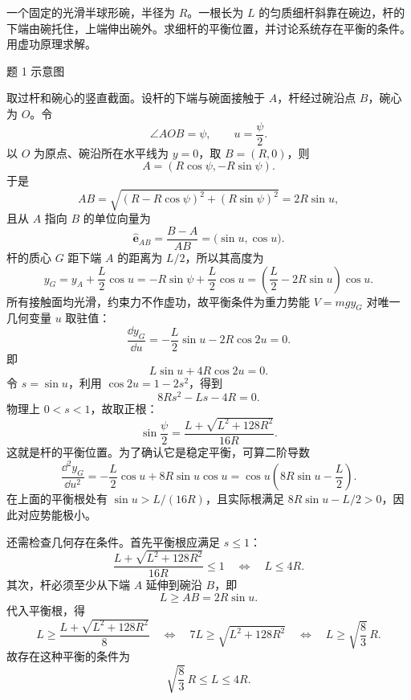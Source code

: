 
\begin{question}[半球碗中的匀质杆]
一个固定的光滑半球形碗，半径为 $R$。一根长为 $L$ 的匀质细杆斜靠在碗边，杆的下端由碗托住，上端伸出碗外。求细杆的平衡位置，并讨论系统存在平衡的条件。用虚功原理求解。

\begin{center}

{\small 题 1 示意图}
\end{center}

\begin{solution}
取过杆和碗心的竖直截面。设杆的下端与碗面接触于 $A$，杆经过碗沿点 $B$，碗心为 $O$。令
\[
  \angle AOB=\psi,
  \qquad u=\frac{\psi}{2}.
\]
以 $O$ 为原点、碗沿所在水平线为 $y=0$，取 $B=(R,0)$，则
\[
  A=(R\cos\psi,-R\sin\psi).
\]
于是
\[
  AB=\sqrt{(R-R\cos\psi)^2+(R\sin\psi)^2}=2R\sin u,
\]
且从 $A$ 指向 $B$ 的单位向量为
\[
  \hat{\bm e}_{AB}
  =\frac{B-A}{AB}
  =\bigl(\sin u,\cos u\bigr).
\]
杆的质心 $G$ 距下端 $A$ 的距离为 $L/2$，所以其高度为
\[
  y_G=y_A+\frac L2\cos u
      =-R\sin\psi+\frac L2\cos u
      =\left(\frac L2-2R\sin u\right)\cos u .
\]
所有接触面均光滑，约束力不作虚功，故平衡条件为重力势能 $V=mg y_G$ 对唯一几何变量 $u$ 取驻值：
\[
  \frac{\dd y_G}{\dd u}
  =-\frac L2\sin u-2R\cos 2u=0.
\]
即
\[
  L\sin u+4R\cos 2u=0.
\]
令 $s=\sin u$，利用 $\cos 2u=1-2s^2$，得到
\[
  8Rs^2-Ls-4R=0.
\]
物理上 $0<s<1$，故取正根：
\[
  \boxed{\sin\frac{\psi}{2}
  =\frac{L+\sqrt{L^2+128R^2}}{16R}}.
\]
这就是杆的平衡位置。为了确认它是稳定平衡，可算二阶导数
\[
  \frac{\dd^2y_G}{\dd u^2}
  =-\frac L2\cos u+8R\sin u\cos u
  =\cos u\left(8R\sin u-\frac L2\right).
\]
在上面的平衡根处有 $\sin u>L/(16R)$，且实际根满足 $8R\sin u-L/2>0$，因此对应势能极小。

还需检查几何存在条件。首先平衡根应满足 $s\le 1$：
\[
  \frac{L+\sqrt{L^2+128R^2}}{16R}\le 1
  \quad\Longleftrightarrow\quad L\le 4R.
\]
其次，杆必须至少从下端 $A$ 延伸到碗沿 $B$，即
\[
  L\ge AB=2R\sin u .
\]
代入平衡根，得
\[
  L\ge \frac{L+\sqrt{L^2+128R^2}}8
  \quad\Longleftrightarrow\quad
  7L\ge \sqrt{L^2+128R^2}
  \quad\Longleftrightarrow\quad
  L\ge \sqrt{\frac83}\,R .
\]
故存在这种平衡的条件为
\[
  \boxed{\sqrt{\frac83}\,R\le L\le 4R.}
\]

\end{solution}
\end{question}

